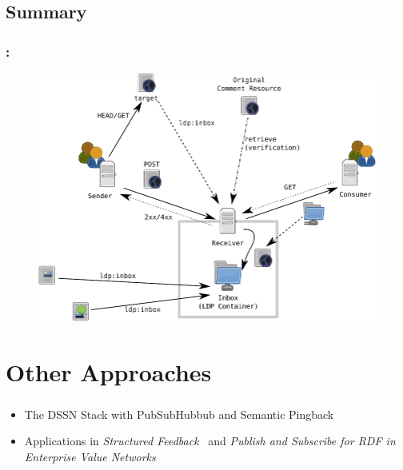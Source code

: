 \documentclass[aspectratio=169,hideallsubsections]{beamer}
\begin{document}
\subsection{Summary}
\begin{frame}
  \frametitle{\insertsection: \insertsubsection}%

    \begin{figure}
     \begin{center}
     \includegraphics[width=.7\textwidth]{LingedDataNotifications/LDN-overview-all}
     \end{center}
    \end{figure}

\end{frame}

\section{Other Approaches}
\begin{frame}
  \frametitle{\insertsection}%

  \begin{itemize}
   \item The DSSN Stack \cite{tramp-s-2012--a} with PubSubHubbub and Semantic Pingback
   \item Applications in \emph{Structured Feedback}~\cite{arndt-2016-ldow-structured-feedback--} and \emph{Publish and Subscribe for RDF in Enterprise Value Networks}~\cite{frommhold-m-pubsub-2016}
  \end{itemize}

\end{frame}
\end{document}
